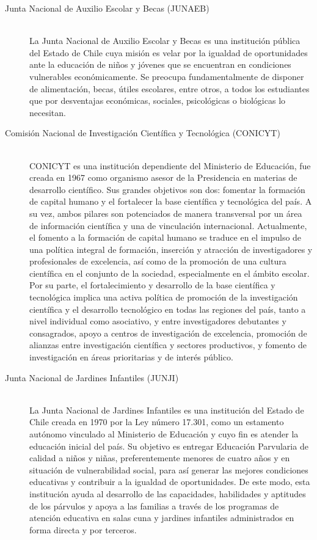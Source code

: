 \begin{description}
\begin{description}
\item[Junta Nacional de Auxilio Escolar y Becas (JUNAEB)] \hfill \\
La Junta Nacional de Auxilio Escolar y Becas es una institución pública del Estado de Chile cuya misión es velar por la igualdad de oportunidades ante la educación de niños y jóvenes que se encuentran en condiciones vulnerables económicamente. 
Se preocupa fundamentalmente de disponer de alimentación, becas, útiles escolares, entre otros, a todos los estudiantes que por desventajas económicas, sociales, psicológicas o biológicas lo necesitan. \cite{junaeb}
\item[Comisión Nacional de Investigación Científica y Tecnológica (CONICYT)] \hfill \\
CONICYT es una institución dependiente del Ministerio de Educación, fue creada en 1967 como organismo asesor de la Presidencia en materias de desarrollo científico. Sus grandes objetivos son dos: fomentar la formación de capital humano y el fortalecer la base científica y tecnológica del país. A su vez, ambos pilares son potenciados de manera transversal por un área de información científica y una de vinculación internacional. 
 Actualmente, el fomento a la formación de capital humano se traduce en el impulso de una política integral de formación, inserción y atracción de investigadores y profesionales de excelencia, así como de la promoción de una cultura científica en el conjunto de la sociedad, especialmente en el ámbito escolar. Por su parte, el fortalecimiento y desarrollo de la base científica y tecnológica implica una activa política de promoción de la investigación científica y el desarrollo tecnológico en todas las regiones del país, tanto a nivel individual como asociativo, y entre investigadores debutantes y consagrados, apoyo a centros de investigación de excelencia, promoción de alianzas entre investigación científica y sectores productivos, y fomento de investigación en áreas prioritarias y de interés público. \cite{conicyt}
\item[Junta Nacional de Jardines Infantiles (JUNJI)] \hfill \\
La Junta Nacional de Jardines Infantiles es una institución del Estado de Chile creada en 1970 por la Ley número 17.301, como un estamento autónomo vinculado al Ministerio de Educación y cuyo fin es atender la educación inicial del país.
Su objetivo es entregar Educación Parvularia de calidad a niños y niñas, preferentemente menores de cuatro años y en situación de vulnerabilidad social, para así generar las mejores condiciones educativas y contribuir a la igualdad de oportunidades. De este modo, esta institución ayuda al desarrollo de las capacidades, habilidades y aptitudes de los párvulos y apoya a las familias a través de los programas de atención educativa en salas cuna y jardines infantiles administrados en forma directa y por terceros.\cite{junji}

\end{description}
\end{description}
